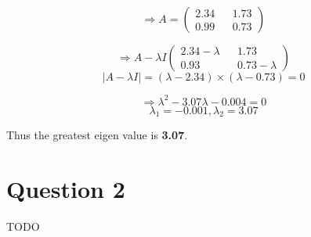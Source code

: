 \documentclass{article}
\begin{document}
\begin{equation*}
    \Rightarrow A = \begin{pmatrix}
        2.34 && 1.73 \\ 0.99 && 0.73
    \end{pmatrix}
\end{equation*}

\begin{equation*}
    \Rightarrow A - \lambda I \begin{pmatrix}
        2.34 - \lambda && 1.73 \\ 0.93 && 0.73 - \lambda
    \end{pmatrix}
\end{equation*}
\begin{equation*}
    |A - \lambda I| = (\lambda - 2.34)\times(\lambda - 0.73) = 0
\end{equation*}

\begin{equation*}
    \Rightarrow \lambda^2 - 3.07\lambda - 0.004 = 0
\end{equation*}
\begin{equation*}
    \lambda_1 = -0.001, \lambda_2 = 3.07
\end{equation*}

Thus the greatest eigen value is \textbf{3.07}.

\section*{Question 2}
TODO
\end{document}
